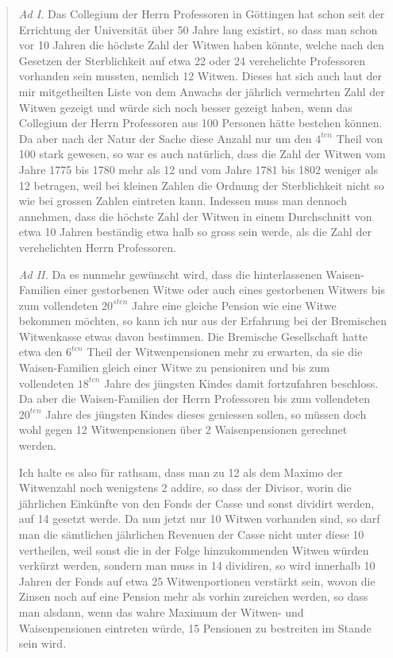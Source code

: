 \documentclass[12pt,a4paper]{article}
\begin{document}
\begin{quote}
\textit{Ad I.} Das Collegium der Herrn Professoren in G\"ottingen hat schon seit der Errichtung der Universit\"at \"uber 50 Jahre lang existirt, so dass man schon vor 10 Jahren die h\"ochste Zahl der Witwen haben k\"onnte, welche nach den Gesetzen der Sterblichkeit auf etwa 22 oder 24 verehelichte Professoren vorhanden sein mussten, nemlich 12 Witwen. Dieses hat sich auch laut der mir mitgetheilten Liste von dem Anwachs der j\"ahrlich vermehrten Zahl der Witwen gezeigt und w\"urde sich noch besser gezeigt haben, wenn das Collegium der Herrn Professoren aus 100 Personen h\"atte bestehen k\"onnen. Da aber nach der Natur der Sache diese Anzahl nur um den $4^{ten}$ Theil von 100 stark gewesen, so war es auch nat\"urlich, dass die Zahl der Witwen vom Jahre 1775 bis 1780 mehr als 12 und vom Jahre 1781 bis 1802 weniger als 12 betragen, weil bei kleinen Zahlen die Ordnung der Sterblichkeit nicht so wie bei grossen Zahlen eintreten kann. Indessen muss man dennoch annehmen, dass die h\"ochste Zahl der Witwen in einem Durchschnitt von etwa 10 Jahren best\"andig etwa halb so gross sein werde, als die Zahl der verehelichten Herrn Professoren.

\textit{Ad II.} Da es nunmehr gew\"unscht wird, dass die hinterlassenen Waisen-Familien einer gestorbenen Witwe oder auch eines gestorbenen Witwers bis zum vollendeten $20^{sten}$ Jahre eine gleiche Pension wie eine Witwe bekommen m\"ochten, so kann ich nur aus der Erfahrung bei der Bremischen Witwenkasse etwas davon bestimmen. Die Bremische Gesellschaft hatte etwa den $6^{ten}$ Theil der Witwenpensionen mehr zu erwarten, da sie die Waisen-Familien gleich einer Witwe zu pensioniren und bis zum vollendeten $18^{ten}$ Jahre des j\"ungsten Kindes damit fortzufahren beschloss. Da aber die Waisen-Familien der Herrn Professoren bis zum vollendeten $20^{ten}$ Jahre des j\"ungsten Kindes dieses geniessen sollen, so m\"ussen doch wohl gegen 12 Witwenpensionen \"uber 2 Waisenpensionen gerechnet werden.

Ich halte es also f\"ur rathsam, dass man zu 12 als dem Maximo der Witwenzahl noch wenigstens 2 addire, so dass der Divisor, worin die j\"ahrlichen Eink\"unfte von den Fonds der Casse und sonst dividirt werden, auf 14 gesetzt werde. Da nun jetzt nur 10 Witwen vorhanden sind, so darf man die s\"amtlichen j\"ahrlichen Revenuen der Casse nicht unter diese 10 vertheilen, weil sonst die in der Folge hinzukommenden Witwen w\"urden verk\"urzt werden, sondern man muss in 14 dividiren, so wird innerhalb 10 Jahren der Fonds auf etwa 25 Witwenportionen verst\"arkt sein, wovon die Zinsen noch auf eine Pension mehr als vorhin zureichen werden, so dass man alsdann, wenn das wahre Maximum der Witwen- und Waisenpensionen eintreten w\"urde, 15 Pensionen zu bestreiten im Stande sein wird.
\end{quote}
\end{document}
